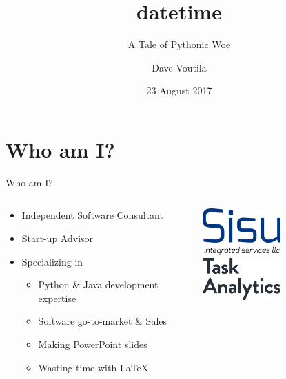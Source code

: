 \documentclass[10pt]{beamer}
\title[datetime]{datetime}
\subtitle{A Tale of Pythonic Woe}
\author{Dave Voutila}
\institute{
	voutilad@gmail.com \\
	https://github.com/voutilad \\
	@voutilad
}
\date{23 August 2017}
\newif\ifplacelogo %
\begin{document}
\maketitle

\section{Who am I?}
\begin{frame}{Who am I?}
	\begin{columns}
		\begin{column}{0.5 \textwidth}
			\begin{itemize}
				\item Independent Software Consultant
				\item Start-up Advisor
				\item Specializing in
					\begin{itemize}
						\item Python \& Java development expertise
						\item Software go-to-market \& Sales
						\item Making PowerPoint slides
						\item Wasting time with \LaTeX
					\end{itemize}
			\end{itemize}
		\end{column}
		\begin{column}{0.5 \textwidth}
			\centering
			\includegraphics[width=3cm]{images/sisu.png}
			\vspace{1cm}
			\includegraphics[width=3cm]{images/ta.png}
		\end{column}
	\end{columns}
\end{frame}

\placelogofalse
\end{document}
